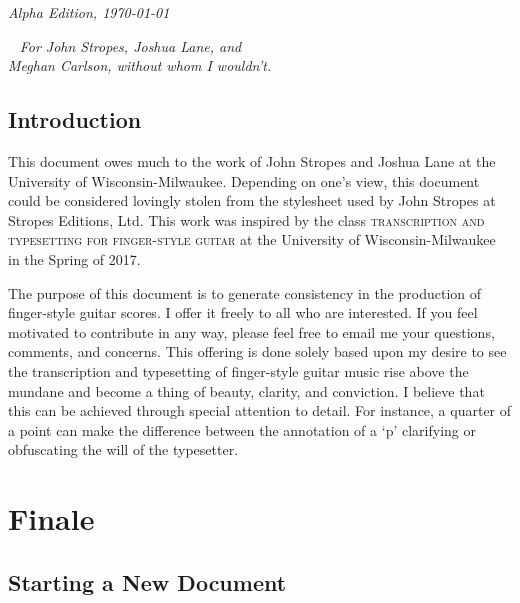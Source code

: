 \documentclass[]{memoir}
\begin{document}
  \par\textit{Alpha Edition, \today}

  \clearpage

\tableofcontents



\listoftables

\clearpage
~\vfill
{\Huge \textit{For John Stropes, Joshua Lane, and}}\\

\vspace*{.15in}
{\Huge \textit{Meghan Carlson, without whom I wouldn't.}}
\vfill
\vfill

\clearpage
\pagestyle{ruled}
\nouppercaseheads

\chapter{Introduction}
This document owes much to the work of John Stropes and Joshua Lane at
the University of Wisconsin-Milwaukee. Depending on one's view, this
document could be considered lovingly stolen from the stylesheet used
by John Stropes at Stropes Editions, Ltd. This work was inspired by
the class \textsc{transcription and typesetting for finger-style
  guitar} at the University of Wisconsin-Milwaukee in the Spring of
2017.

The purpose of this document is to generate consistency in the
production of finger-style guitar scores. I offer it freely to all who
are interested. If you feel motivated to contribute in any way, please
feel free to email me your questions, comments, and concerns. This
offering is done solely based upon my desire to see the transcription
and typesetting of finger-style guitar music rise above the mundane
and become a thing of beauty, clarity, and conviction. I believe that
this can be achieved through special attention to detail. For
instance, a quarter of a point can make the difference between the
annotation of a `\textsf{p}' clarifying or obfuscating the will of the
typesetter.

\mainmatter

\part{Finale}
\chapter{Starting a New Document}
\label{cha:start-new-docum}
\end{document}
